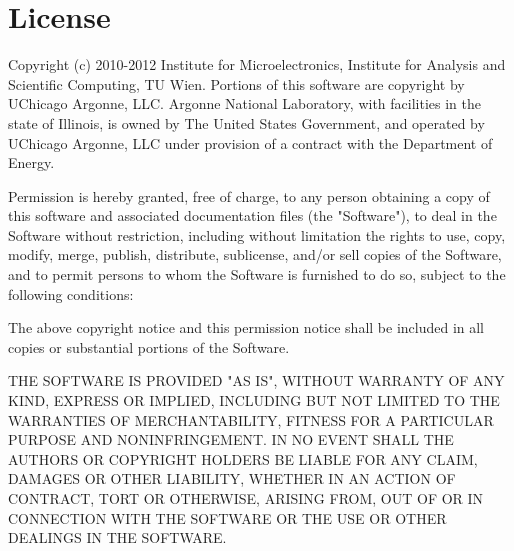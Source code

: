 
\chapter{License} %

Copyright (c) 2010-2012 Institute for Microelectronics, Institute for Analysis and Scientific Computing, TU Wien.
Portions of this software are copyright by UChicago Argonne, LLC.
Argonne National Laboratory, with facilities in the state of Illinois,
is owned by The United States Government, and operated by UChicago Argonne, LLC
under provision of a contract with the Department of Energy.

Permission is hereby granted, free of charge, to any person obtaining a copy
of this software and associated documentation files (the "Software"), to deal
in the Software without restriction, including without limitation the rights
to use, copy, modify, merge, publish, distribute, sublicense, and/or sell
copies of the Software, and to permit persons to whom the Software is
furnished to do so, subject to the following conditions:

The above copyright notice and this permission notice shall be included in
all copies or substantial portions of the Software.

THE SOFTWARE IS PROVIDED "AS IS", WITHOUT WARRANTY OF ANY KIND, EXPRESS OR
IMPLIED, INCLUDING BUT NOT LIMITED TO THE WARRANTIES OF MERCHANTABILITY,
FITNESS FOR A PARTICULAR PURPOSE AND NONINFRINGEMENT. IN NO EVENT SHALL THE
AUTHORS OR COPYRIGHT HOLDERS BE LIABLE FOR ANY CLAIM, DAMAGES OR OTHER
LIABILITY, WHETHER IN AN ACTION OF CONTRACT, TORT OR OTHERWISE, ARISING FROM,
OUT OF OR IN CONNECTION WITH THE SOFTWARE OR THE USE OR OTHER DEALINGS IN
THE SOFTWARE.